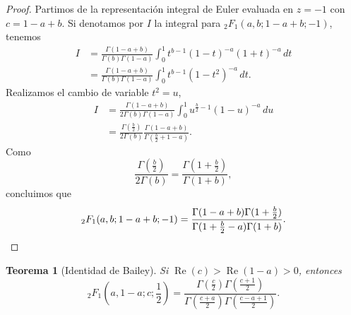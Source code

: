 \documentclass[12pt,a4paper]{book}
\renewcommand{\Re}{\operatorname{Re}}
\newtheorem{theorem}{Teorema}
\begin{document}
\begin{proof}
Partimos de la representación integral de Euler evaluada en $z=-1$ con $c=1-a+b$. Si denotamos por $I$ la integral para ${}_{2}F_{1}(a,b;1-a+b;-1)$, tenemos
\begin{align*}
 I &= 
 \frac{\Gamma(1-a+b)}{\Gamma(b)\Gamma(1-a)} \int_0^1 t^{b-1} (1-t)^{-a} (1+t)^{-a} \, dt \\ &= 
 \frac{\Gamma(1-a+b)}{\Gamma(b)\Gamma(1-a)}\int_0^1 t^{b-1} (1-t^2)^{-a} \, dt.   
\end{align*}
Realizamos el cambio de variable $t^2 = u$,
\begin{align*}
   I &=   
   \frac{\Gamma(1-a+b)}{2\Gamma(b)\Gamma(1-a)} \int_0^1 u^{\frac{b}{2}-1} (1-u)^{-a} \, du \\ 
   &= \frac{\Gamma(\frac{b}{2})}{2\Gamma(b)} \frac{\Gamma(1-a+b)}{\Gamma(\frac{b}{2}+1-a)}.
\end{align*}
Como
\[ 
\frac{\Gamma(\frac{b}{2})}{2\Gamma(b)} = \frac{\Gamma(1+\frac{b}{2})}{\Gamma(1+b)},
\]
concluimos que
\begin{equation*}
  {}_{2}F_{1}(a, b; 1-a+b; -1) = \frac{\Gamma(1-a+b) \Gamma(1+\frac{b}{2})}{\Gamma(1+\frac{b}{2}-a) \Gamma(1+b)}.
\qedhere  
\end{equation*}
\end{proof}

\begin{theorem}[Identidad de Bailey]
\label{teo:bailey}
Si $\Re(c)>\Re(1-a)>0$, entonces
\[
{}_{2}F_{1}\left(a, 1-a; c; \frac{1}{2}\right) = \frac{\Gamma(\frac{c}{2})\Gamma(\frac{c+1}{2})}{\Gamma(\frac{c+a}{2})\Gamma(\frac{c-a+1}{2})}.
\]
\end{theorem}
\end{document}
